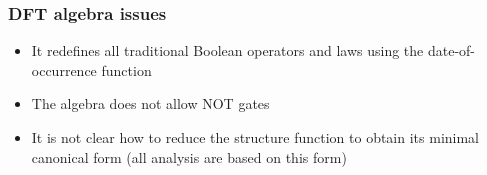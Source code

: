 \begin{frame}
\frametitle{DFT algebra issues}

\begin{itemize}
  \item It redefines all traditional Boolean operators and laws using the date-of-occurrence function
  \item The algebra does not allow NOT gates
  \item It is not clear how to reduce the structure function to obtain its minimal canonical form (all analysis are based on this form)
\end{itemize}
\end{frame}